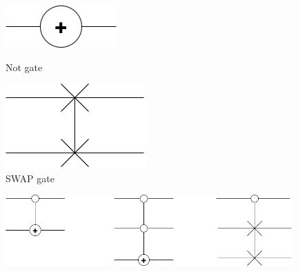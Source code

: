 \begin{figure}[h]
    \centering
    \begin{minipage}[b]{0.48\textwidth}
        \centering
        \includegraphics[width=\textwidth]{Images/plus.drawio.png}
        \caption{Not gate}
        \label{fig8}
    \end{minipage}
    \hspace{0.02\textwidth} %
    \begin{minipage}[b]{0.48\textwidth}
        \centering
        \includegraphics[width=\textwidth ]{Images/x.drawio.png}
        \caption{SWAP gate}
        \label{fig9}
    \end{minipage}
\end{figure}



\begin{figure}[h]
    \centering
    \includegraphics[width = 11cm]{./Images/LAST.drawio.png}
    \caption{}
    \label{fig10}
\end{figure}

